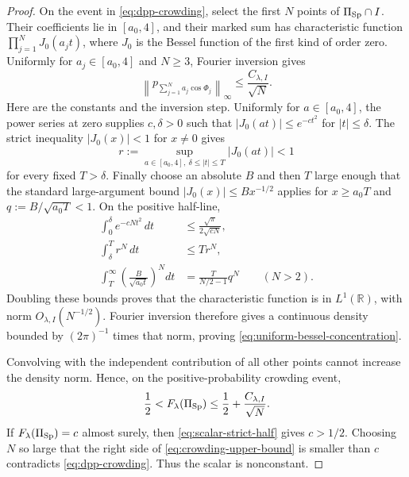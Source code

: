 \begin{proof}
On the event in \eqref{eq:dpp-crowding}, select the first \(N\) points of
\(\Pi_{\mathrm{Sp}}\cap I\).  Their coefficients lie in \([a_0,4]\), and their marked
sum has characteristic function
\(\prod_{j=1}^N J_0(a_jt)\), where \(J_0\) is the Bessel function of the first
kind of order zero.  Uniformly for \(a_j\in[a_0,4]\) and
\(N\ge3\), Fourier inversion gives
\begin{equation}
 \left\|p_{\sum_{j=1}^Na_j\cos\Phi_j}\right\|_\infty
 \le \frac{C_{\lambda,I}}{\sqrt N}.
 \label{eq:uniform-bessel-concentration}
\end{equation}
Here are the constants and the inversion step.  Uniformly for
\(a\in[a_0,4]\), the power series at zero supplies \(c,\delta>0\) such that
\(|J_0(at)|\le e^{-ct^2}\) for \(|t|\le\delta\).  The strict inequality
\(|J_0(x)|<1\) for \(x\ne0\) gives
\[
 r:=\sup_{a\in[a_0,4],\ \delta\le|t|\le T}|J_0(at)|<1
\]
for every fixed \(T>\delta\).  Finally choose an absolute \(B\) and then
\(T\) large enough that the standard large-argument bound
\(|J_0(x)|\le Bx^{-1/2}\) applies for \(x\ge a_0T\) and
\(q:=B/\sqrt{a_0T}<1\).  On the positive half-line,
\begin{align*}
 \int_0^\delta e^{-cNt^2}\,dt
   &\le\frac{\sqrt\pi}{2\sqrt{cN}},\\
 \int_\delta^T r^N\,dt&\le Tr^N,\\
 \int_T^\infty\left(\frac{B}{\sqrt{a_0t}}\right)^Ndt
   &=\frac{T}{N/2-1}q^N \qquad(N>2).
\end{align*}
Doubling these bounds proves that the characteristic function is in
\(L^1(\mathbb R)\), with norm \(O_{\lambda,I}(N^{-1/2})\).  Fourier inversion
therefore gives a continuous density bounded by
\((2\pi)^{-1}\) times that norm, proving
\eqref{eq:uniform-bessel-concentration}.

Convolving with the independent contribution of all other points cannot
increase the density norm.  Hence, on the positive-probability crowding
event,
\begin{equation}
 \frac12<F_\lambda(\Pi_{\mathrm{Sp}})
 \le\frac12+\frac{C_{\lambda,I}}{\sqrt N}.
 \label{eq:crowding-upper-bound}
\end{equation}
If \(F_\lambda(\Pi_{\mathrm{Sp}})=c\) almost surely, then
\eqref{eq:scalar-strict-half} gives \(c>1/2\).  Choosing \(N\) so large
that the right side of \eqref{eq:crowding-upper-bound} is smaller than
\(c\) contradicts \eqref{eq:dpp-crowding}.  Thus the scalar is nonconstant.
\end{proof}
